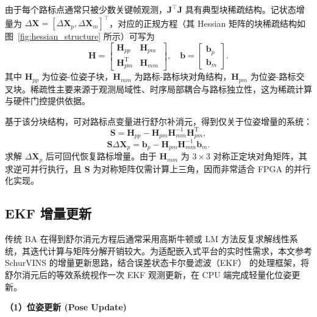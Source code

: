 由于每个路标点通常只被少数关键帧观测，$\mathbf{J}^\top\mathbf{J}$ 具有典型块稀疏结构。记状态增量为 $\Delta\mathbf{X}=[\Delta\mathbf{X}_p,\Delta\mathbf{X}_m]^\top$，对应的正规方程（其 Hessian 矩阵的块稀疏结构如图~\ref{fig:hessian_structure} 所示）可写为
\begin{equation}
\mathbf{H}
=\begin{bmatrix}
\mathbf{H}_{pp} & \mathbf{H}_{pm} \\
\mathbf{H}_{pm}^{\mathrm{T}} & \mathbf{H}_{mm}
\end{bmatrix},\quad
\mathbf{b}=
\begin{bmatrix}
\mathbf{b}_p \\
\mathbf{b}_m
\end{bmatrix}.
\end{equation}
其中 $\mathbf{H}_{pp}$ 为位姿-位姿子块，$\mathbf{H}_{mm}$ 为路标-路标块对角结构，$\mathbf{H}_{pm}$ 为位姿-路标交叉块。稀疏性主要来源于观测局域性、时序局部耦合与路标独立性，这为稀疏计算与硬件门控提供依据。

基于该分块结构，可对路标点变量进行舒尔补消元，得到仅关于位姿增量的系统：
\begin{equation}
\mathbf{S} = \mathbf{H}_{pp} - \mathbf{H}_{pm}\mathbf{H}_{mm}^{-1}\mathbf{H}_{pm}^{\mathrm{T}},
\end{equation}
\begin{equation}
\mathbf{S}\Delta\mathbf{X}_p = \mathbf{b}_p - \mathbf{H}_{pm}\mathbf{H}_{mm}^{-1}\mathbf{b}_m.
\end{equation}
求解 $\Delta\mathbf{X}_p$ 后可回代恢复路标增量。由于 $\mathbf{H}_{mm}$ 为 $3\times3$ 对称正定块对角矩阵，其求逆可并行执行，且 $\mathbf{S}$ 为对称矩阵仅需计算上三角，因而非常适合 FPGA 的并行化实现\cite{liu2020pi}。

\subsection{EKF 增量更新}

传统 BA 在得到舒尔消元方程后通常采用高斯牛顿或 LM 方法反复求解线性系统，其迭代计算与矩阵分解开销较大。为适配嵌入式平台的实时性需求，本文参考 SchurVINS 的增量更新思路\cite{fan2024schurvins}，结合误差状态卡尔曼滤波（EKF）\cite{sola2017quaternion} 的处理框架，将舒尔消元后的等效系统视作一次 EKF 观测更新，在 CPU 端完成轻量化位姿更新。

\textbf{（1）位姿更新 (Pose Update)}

